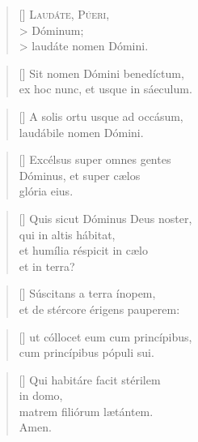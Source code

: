 \documentclass[omni.tex]{subfiles}
\begin{document}
\settowidth{\versewidth}{Et ne nos ind\'ucas in tentati\'onem}

\begin{verse}[\versewidth]
\lettrine[lhang=1.0,nindent=0em]{L}{aud\'ate, P\'ueri}, \\>
D\'ominum; \\> 
laud\'ate nomen D\'omini.
\end{verse}

\begin{verse}[\versewidth]
Sit nomen D\'omini bened\'ictum, \\
ex hoc nunc, et usque in s\'aeculum.
\end{verse}

\begin{verse}[\versewidth]
A solis ortu usque ad occ\'asum, \\
laud\'abile nomen D\'omini.
\end{verse}

\begin{verse}[\versewidth]
Exc\'elsus super omnes gentes \\
D\'ominus, et super c\ae los \\
gl\'oria eius. \\[3\baselineskip]
\end{verse}
\pagebreak

\begin{verse}[\versewidth]
Quis sicut D\'ominus Deus noster, \\
qui in altis h\'abitat, \\
et hum\'ilia r\'espicit in c\ae lo \\
et in terra?
\end{verse}

\begin{verse}[\versewidth]
S\'uscitans a terra \'inopem, \\
et de st\'ercore \'erigens pauperem:
\end{verse}

\begin{verse}[\versewidth]
ut c\'ollocet eum cum princ\'ipibus, \\
cum princ\'ipibus p\'opuli sui.
\end{verse}

\begin{verse}[\versewidth]
Qui habit\'are facit st\'erilem \\
in domo, \\
matrem fili\'orum l\ae t\'antem. \\
Amen. \\[4\baselineskip]
\end{verse}

\pagebreak
\end{document}
